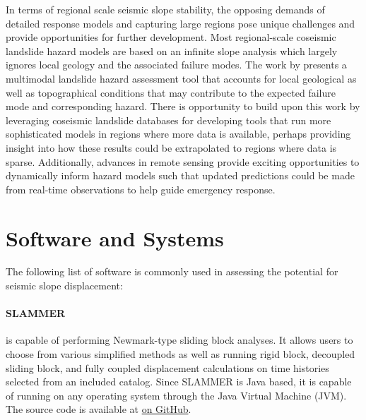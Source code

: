 In terms of regional scale seismic slope stability, the opposing demands of detailed response models and capturing large regions pose unique challenges and provide opportunities for further development. Most regional-scale coseismic landslide hazard models are based on an infinite slope analysis which largely ignores local geology and the associated failure modes. The work by \cite{grant2016multimodal} presents a multimodal landslide hazard assessment tool that accounts for local geological as well as topographical conditions that may contribute to the expected failure mode and corresponding hazard. There is opportunity to build upon this work by leveraging coseismic landslide databases for developing tools that run more sophisticated models in regions where more data is available, perhaps providing insight into how these results could be extrapolated to regions where data is sparse. Additionally, advances in remote sensing provide exciting opportunities to dynamically inform hazard models such that updated predictions could be made from real-time observations to help guide emergency response.


\section{Software and Systems}
\label{sec:eq_landslide_tools}

The following list of software is commonly used in assessing the potential for seismic slope displacement:\\

\paragraph{SLAMMER}
 \citep{jibson2013slammer} is capable of performing Newmark-type sliding block analyses. It allows users to choose from various simplified methods as well as running rigid block, decoupled sliding block, and fully coupled displacement calculations on time histories selected from an included catalog. Since SLAMMER is Java based, it is capable of running on any operating system through the Java Virtual Machine (JVM). The source code is available at \href{https://github.com/mjibson/slammer}{on GitHub}.


